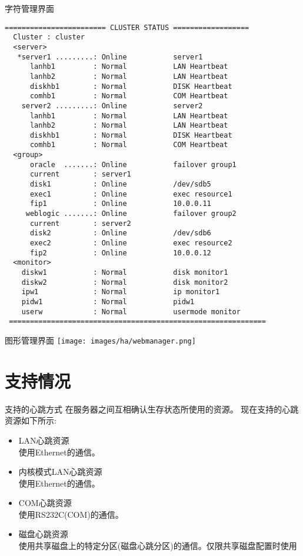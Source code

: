 \documentclass[compress,trans]{beamer} %
\begin{document}
\begin{frame}[containsverbatim]{字符管理界面}
\fontsize{7pt}{2}
\begin{verbatim}
======================== CLUSTER STATUS ==================
  Cluster : cluster             
  <server>
   *server1 .........: Online           server1
      lanhb1         : Normal           LAN Heartbeat
      lanhb2         : Normal           LAN Heartbeat
      diskhb1        : Normal           DISK Heartbeat
      comhb1         : Normal           COM Heartbeat
    server2 .........: Online           server2
      lanhb1         : Normal           LAN Heartbeat
      lanhb2         : Normal           LAN Heartbeat
      diskhb1        : Normal           DISK Heartbeat
      comhb1         : Normal           COM Heartbeat
  <group>
      oracle  .......: Online           failover group1
      current        : server1
      disk1          : Online           /dev/sdb5
      exec1          : Online           exec resource1
      fip1           : Online           10.0.0.11
     weblogic .......: Online           failover group2
      current        : server2
      disk2          : Online           /dev/sdb6
      exec2          : Online           exec resource2
      fip2           : Online           10.0.0.12
  <monitor>
    diskw1           : Normal           disk monitor1
    diskw2           : Normal           disk monitor2
    ipw1             : Normal           ip monitor1
    pidw1            : Normal           pidw1
    userw            : Normal           usermode monitor
 =============================================================
\end{verbatim}
\end{frame}

\begin{frame}{图形管理界面}
\texttt{[image: images/ha/webmanager.png]}
\end{frame}


\section{支持情况}
\begin{frame}{支持的心跳方式}
在服务器之间互相确认生存状态所使用的资源。
现在支持的心跳资源如下所示:
\begin{itemize}
  \item LAN心跳资源 \\  使用Ethernet的通信。
  \item 内核模式LAN心跳资源  \\ 使用Ethernet的通信。
  \item COM心跳资源 \\  使用RS232C(COM)的通信。
  \item 磁盘心跳资源 \\ 使用共享磁盘上的特定分区(磁盘心跳分区)的通信。仅限共享磁盘配置时使用
\end{itemize}
\end{frame}
\end{document}

